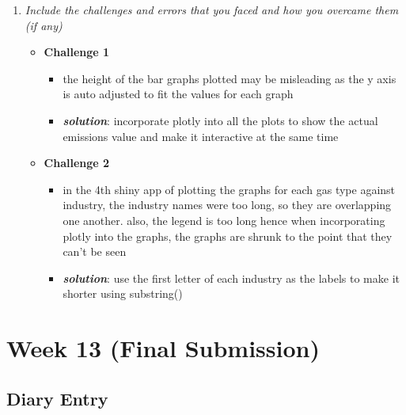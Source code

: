 \documentclass[
]{article}
\providecommand{\tightlist}{%
  \setlength{\itemsep}{0pt}\setlength{\parskip}{0pt}}
\begin{document}
\begin{enumerate}
\def\labelenumi{\arabic{enumi}.}
\tightlist
\item
  \emph{Include the challenges and errors that you faced and how you
  overcame them (if any)}

  \begin{itemize}
  \item
    \textbf{Challenge 1}

    \begin{itemize}
    \item
      the height of the bar graphs plotted may be misleading as the y
      axis is auto adjusted to fit the values for each graph
    \item
      \textbf{\emph{solution}}: incorporate plotly into all the plots to
      show the actual emissions value and make it interactive at the
      same time
    \end{itemize}
  \item
    \textbf{Challenge 2}

    \begin{itemize}
    \item
      in the 4th shiny app of plotting the graphs for each gas type
      against industry, the industry names were too long, so they are
      overlapping one another. also, the legend is too long hence when
      incorporating plotly into the graphs, the graphs are shrunk to the
      point that they can't be seen
    \item
      \textbf{\emph{solution}}: use the first letter of each industry as
      the labels to make it shorter using substring()
    \end{itemize}
  \end{itemize}
\end{enumerate}

\hypertarget{week-13-final-submission}{%
\section{Week 13 (Final Submission)}\label{week-13-final-submission}}

\hypertarget{diary-entry}{%
\subsection{Diary Entry}\label{diary-entry}}
\end{document}
